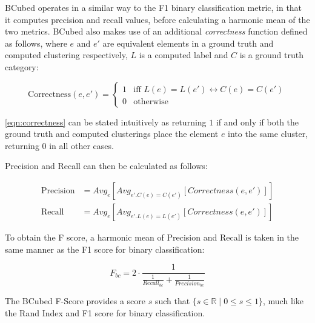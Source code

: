 \documentclass[../main.tex]{subfiles}
\begin{document}
	BCubed operates in a similar way to the F1 binary classification metric, in that it computes precision and recall values, before calculating a harmonic mean of the two metrics. BCubed also makes use of an additional \emph{correctness} function defined as follows, where $e$ and $e'$ are equivalent elements in a ground truth and computed clustering respectively, $L$ is a computed label and $C$ is a ground truth category:
	
	\begin{equation}
	\label{eqn:correctness}
	    \text{Correctness}(e,e') = 
	    \begin{cases}
	        1 & \text{iff $L(e) = L(e') \leftrightarrow C(e) = C(e')$}\\
	        0 & \text{otherwise}
	    \end{cases}
	\end{equation}
	
	\autoref{eqn:correctness} can be stated intuitively as returning $1$ if and only if both the ground truth and computed clusterings place the element $e$ into the same cluster, returning $0$ in all other cases.
	
	Precision and Recall can then be calculated as follows:
	
    \begin{align}
    \label{eqn:bcubed-precision}
        \text{Precision} &= Avg_e [Avg_{e' . C(e) = C(e')}[Correctness(e,e')]]\\
        \label{eqn:bcubed-recall}
        \text{Recall} &= Avg_e [Avg_{e' . L(e) = L(e')}[Correctness(e,e')]]
    \end{align}

To obtain the F score, a harmonic mean of Precision and Recall is taken in the same manner as the F1 score for binary classification:

\begin{equation}
    F_{bc} = 2 \cdot \frac{1}{\frac{1}{Recall_{bc}} + \frac{1}{Precision_{bc}}}
\end{equation}

The BCubed F-Score provides a score $s$ such that $ \{s\in\mathbb{R} \mid 0\leq s \leq 1\} $, much like the Rand Index and F1 score for binary classification.
\end{document}
